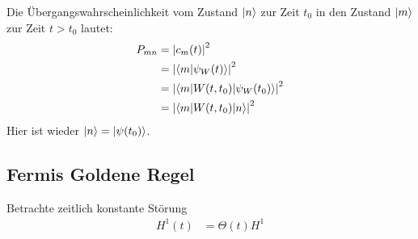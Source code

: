 	Die Übergangswahrscheinlichkeit vom Zustand $\ket{n}$ zur Zeit $t_0$ in den Zustand $\ket{m}$ zur Zeit $t>t_0$ lautet:
		\begin{align*}
			P_{mn} &= \left| c_m(t) \right|^2 \\
			&= \left| \braket{m | \psi_W(t)} \right|^2 \\
			&= \left| \braket{m | W(t,t_0) | \psi_W(t_0)} \right|^2 \\
			&= \left| \braket{m | W(t,t_0) | n}\right|^2
		\end{align*}
	Hier ist wieder $\ket{n} = \ket{\psi(t_0)}$.
\subsection{Fermis Goldene Regel}
	Betrachte zeitlich konstante Störung
		\begin{align*}
			H^1(t) &= \Theta (t) H^1
		\end{align*}